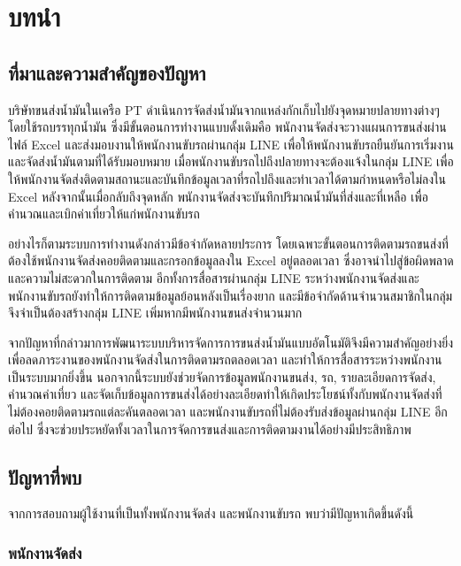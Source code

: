 \chapter{บทนำ}

\section{ที่มาและความสำคัญของปัญหา}

บริษัทขนส่งน้ำมันในเครือ PT ดำเนินการจัดส่งน้ำมันจากแหล่งกักเก็บไปยังจุดหมายปลายทางต่างๆ โดยใช้รถบรรทุกน้ำมัน ซึ่งมีขั้นตอนการทำงานแบบดั้งเดิมคือ พนักงานจัดส่งจะวางแผนการขนส่งผ่านไฟล์ Excel และส่งมอบงานให้พนักงานขับรถผ่านกลุ่ม LINE เพื่อให้พนักงานขับรถยืนยันการเริ่มงานและจัดส่งน้ำมันตามที่ได้รับมอบหมาย เมื่อพนักงานขับรถไปถึงปลายทางจะต้องแจ้งในกลุ่ม LINE เพื่อให้พนักงานจัดส่งติดตามสถานะและบันทึกข้อมูลเวลาที่รถไปถึงและทำเวลาได้ตามกำหนดหรือไม่ลงใน Excel หลังจากนั้นเมื่อกลับถึงจุดหลัก พนักงานจัดส่งจะบันทึกปริมาณน้ำมันที่ส่งและที่เหลือ เพื่อคำนวณและเบิกค่าเที่ยวให้แก่พนักงานขับรถ

อย่างไรก็ตามระบบการทำงานดังกล่าวมีข้อจำกัดหลายประการ โดยเฉพาะขั้นตอนการติดตามรถขนส่งที่ต้องใช้พนักงานจัดส่งคอยติดตามและกรอกข้อมูลลงใน Excel อยู่ตลอดเวลา ซึ่งอาจนำไปสู่ข้อผิดพลาดและความไม่สะดวกในการติดตาม อีกทั้งการสื่อสารผ่านกลุ่ม LINE ระหว่างพนักงานจัดส่งและพนักงานขับรถยังทำให้การติดตามข้อมูลย้อนหลังเป็นเรื่องยาก และมีข้อจำกัดด้านจำนวนสมาชิกในกลุ่ม จึงจำเป็นต้องสร้างกลุ่ม LINE เพิ่มหากมีพนักงานขนส่งจำนวนมาก

จากปัญหาที่กล่าวมาการพัฒนาระบบบริหารจัดการการขนส่งน้ำมันแบบอัตโนมัติจึงมีความสำคัญอย่างยิ่งเพื่อลดภาระงานของพนักงานจัดส่งในการติดตามรถตลอดเวลา และทำให้การสื่อสารระหว่างพนักงานเป็นระบบมากยิ่งขึ้น นอกจากนี้ระบบยังช่วยจัดการข้อมูลพนักงานขนส่ง, รถ, รายละเอียดการจัดส่ง, คำนวณค่าเที่ยว และจัดเก็บข้อมูลการขนส่งได้อย่างละเอียดทำให้เกิดประโยชน์ทั้งกับพนักงานจัดส่งที่ไม่ต้องคอยติดตามรถแต่ละคันตลอดเวลา และพนักงานขับรถที่ไม่ต้องรับส่งข้อมูลผ่านกลุ่ม LINE อีกต่อไป ซึ่งจะช่วยประหยัดทั้งเวลาในการจัดการขนส่งและการติดตามงานได้อย่างมีประสิทธิภาพ


\section{ปัญหาที่พบ}
จากการสอบถามผู้ใช้งานที่เป็นทั้งพนักงานจัดส่ง และพนักงานขับรถ พบว่ามีปัญหาเกิดขึ้นดังนี้

\subsection{พนักงานจัดส่ง}

